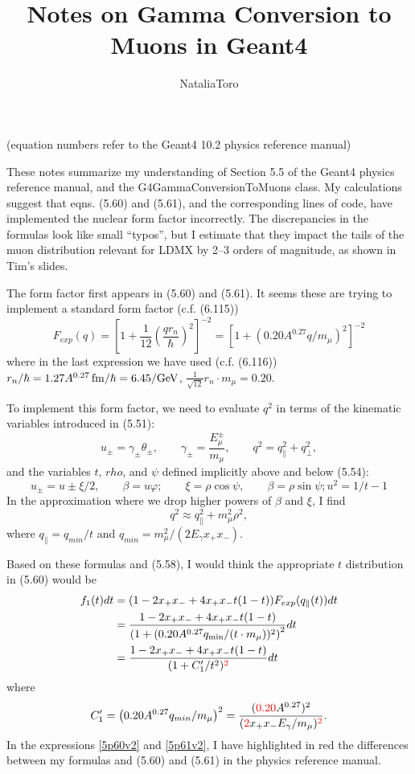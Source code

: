\documentclass[11pt]{article}
\title{Notes on Gamma Conversion to Muons in Geant4}
\author{NataliaToro}
\date{}                               %
\newcommand{\be}{\begin{equation}}
\newcommand{\ee}{\end{equation}}
\newcommand{\pal}{\parallel}
\newcommand{\red}{\color[rgb]{1,0,0}}
\begin{document}
\maketitle

(equation numbers refer to the Geant4 10.2 physics reference manual)

These notes summarize my understanding of Section 5.5 of the Geant4 physics reference manual, and the G4GammaConversionToMuons class.  My calculations suggest that eqns. (5.60) and (5.61), and the corresponding lines of code, have implemented the nuclear form factor incorrectly.  The discrepancies in the formulas look like small ``typos'', but I estimate that they impact the tails of the muon distribution relevant for LDMX by 2--3 orders of magnitude, as shown in Tim's slides.

The form factor first appears in (5.60) and (5.61).  It seems these are trying to implement a standard form factor (c.f. (6.115))
\be
F_{exp}(q)=\left[1+\frac{1}{12} \left( \frac{q r_n}{\hbar} \right)^2 \right]^{-2} = {\left[ 1 + (0.20 A^{0.27} q/m_\mu)^2 \right]^{-2}}
\label{formFactor}
\ee
where in the last expression we have used (c.f. (6.116)) $ r_n/\hbar = 1.27 A^{0.27} \,\rm{fm}/\hbar = 6.45/GeV$, $\frac{1}{\sqrt{12}} r_n\cdot m_\mu = 0.20$.

To implement this form factor, we need to evaluate $q^2$ in terms of the kinematic variables introduced in (5.51):
\be
u_\pm = \gamma_\pm \theta_\pm, \qquad \gamma_\pm = \frac{E_\mu^\pm}{m_\mu}, \qquad q^2 = q_\pal^2 + q_\perp^2,
\ee
and the variables $t$, $rho$, and $\psi$ defined implicitly above and below (5.54):
\be
u_\pm = u \pm \xi/2, \qquad \beta = u \varphi; \qquad \xi = \rho \cos\psi, \qquad \beta = \rho \sin\psi; u^2 = 1/t -1
\ee
In the approximation where we drop higher powers of $\beta$ and $\xi$, I find
\be
q^2 \approx q_\pal^2 + m_\mu^2 \rho^2,
\ee
where $q_\pal = q_{min}/t$ and $q_{min} = m_\mu^2 /(2 E_\gamma x_+ x_-)$.  

Based on these formulas and (5.58), I would think the appropriate $t$ distribution in (5.60) would be
\begin{eqnarray}
f_1(t) dt & = (1 - 2 x_+ x_- + 4 x_+ x_- t (1-t)) F_{exp}(q_\pal(t)) dt\nonumber \\
& = \frac{1 - 2 x_+ x_- + 4 x_+ x_- t (1-t)}{\left(1 + (0.20 A^{0.27} {q_{\min}}/(t \cdot m_\mu) )^2\right)^{2}}  dt\nonumber \\
& = \frac{1 - 2 x_+ x_- + 4 x_+ x_- t (1-t)}{(1 + C_1'/t^2)^{\red 2}}  dt \label{5p60v2}
\end{eqnarray}
where
\be
C_1' = \left(0.20 A^{0.27} q_{min}/m_\mu\right)^2 = \frac{({\red 0.20} A^{0.27})^2}{({\red 2} x_+ x_- E_\gamma/{m_\mu})^{\red 2}}. \label{5p61v2}
\ee
In the expressions \eqref{5p60v2} and \eqref{5p61v2}, I have highlighted in red the differences between my formulas and (5.60) and (5.61) in the physics reference manual.  
\end{document}
